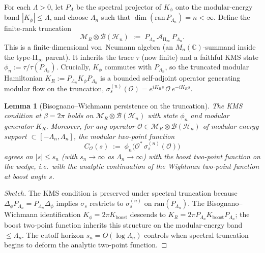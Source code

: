\documentclass[12pt,a4paper]{article}
\newtheorem{lemma}[theorem]{Lemma}
\begin{document}
For each $\Lambda > 0$, let $P_\Lambda$ be the spectral projector of
$K_\phi$ onto the modular-energy band $|K_\phi| \le \Lambda$, and
choose $\Lambda_n$ such that $\dim(\mathrm{ran}\,P_{\Lambda_n}) = n < \infty$.
Define the finite-rank truncation
\begin{equation}
  \mathcal{M}_R \otimes \mathcal{B}(\mathcal{H}_n)
  \;:=\;
  P_{\Lambda_n}\, \mathcal{A}_{\mathrm{II}_\infty}\, P_{\Lambda_n}.
  \label{eq:A61-trunc}
\end{equation}
This is a finite-dimensional von~Neumann algebra (an
$M_n(\mathbb{C})$-summand inside the type-II$_\infty$ parent). It
inherits the trace $\tau$ (now finite) and a faithful KMS state
$\phi_n := \tau / \tau(P_{\Lambda_n})$. Crucially, $K_\phi$ commutes
with $P_{\Lambda_n}$, so the truncated modular Hamiltonian
$K_R := P_{\Lambda_n} K_\phi P_{\Lambda_n}$ is a bounded self-adjoint
operator generating modular flow on the truncation,
$\sigma_s^{(n)}(\mathcal{O}) = e^{i K_R s}\,\mathcal{O}\,e^{-i K_R s}$.

\begin{lemma}[Bisognano--Wichmann persistence on the truncation]
\label{lem:A61-bw-trunc}
The KMS condition at $\beta = 2\pi$ holds on
$\mathcal{M}_R \otimes \mathcal{B}(\mathcal{H}_n)$ with state $\phi_n$
and modular generator $K_R$. Moreover, for any operator
$\mathcal{O} \in \mathcal{M}_R \otimes \mathcal{B}(\mathcal{H}_n)$
of modular energy support $\subset [-\Lambda_n,\Lambda_n]$, the
modular two-point function
\[
  C_\mathcal{O}(s) \;:=\; \phi_n\!\bigl(\mathcal{O}^*\,\sigma_s^{(n)}(\mathcal{O})\bigr)
\]
agrees on $|s| \le s_n$ (with $s_n \to \infty$ as $\Lambda_n\to\infty$)
with the boost two-point function on the wedge, i.e.\ with the analytic
continuation of the Wightman two-point function at boost angle $s$.
\end{lemma}

\begin{proof}[Sketch]
The KMS condition is preserved under spectral truncation because
$\Delta_\phi P_{\Lambda_n} = P_{\Lambda_n}\Delta_\phi$ implies
$\sigma_s$ restricts to $\sigma_s^{(n)}$ on $\mathrm{ran}(P_{\Lambda_n})$.
The Bisognano--Wichmann identification $K_\phi = 2\pi K_{\mathrm{boost}}$
descends to $K_R = 2\pi P_{\Lambda_n} K_{\mathrm{boost}} P_{\Lambda_n}$;
the boost two-point function inherits this structure on the
modular-energy band $\le \Lambda_n$. The cutoff horizon
$s_n = O(\log \Lambda_n)$ controls when spectral truncation begins to
deform the analytic two-point function.
\end{proof}
\end{document}

